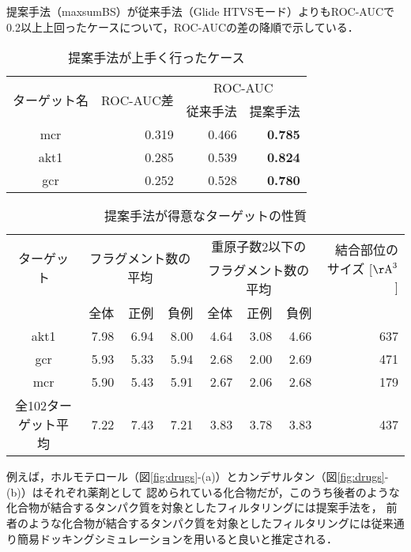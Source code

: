\begin{table}[hb] \centering
	\caption{提案手法が上手く行ったケース}
	\label{table:target_accuracy_good}
	提案手法（maxsumBS）が従来手法（Glide HTVSモード）よりもROC-AUCで\\
	0.2以上上回ったケースについて，ROC-AUCの差の降順で示している．
	\begin{tabular}{c|r|rr}
	\hline
	\multirow{2}{*}{ターゲット名}	&\multirow{2}{*}{ROC-AUC差}	&\multicolumn{2}{c}{ROC-AUC}	\\
							&							&従来手法	&提案手法		\\ \hline
	mcr					&0.319						&0.466		&{\bf 0.785}		\\
	akt1					&0.285						&0.539		&{\bf 0.824}		\\
	gcr						&0.252						&0.528		&{\bf 0.780}		\\ \hline
	\end{tabular}
\end{table}
\begin{table}[htb] \centering
	\caption{提案手法が得意なターゲットの性質}
	\label{table:good_property}
	\begin{tabular}{c|rrrrrrr}
	\hline
	\multirow{2}{*}{ターゲット}	&\multicolumn{3}{c}{\multirow{2}{*}{フラグメント数の平均}}	&\multicolumn{3}{c}{重原子数2以下の}		&\multirow{2}{*}{結合部位のサイズ [$\mathrm{\AA}^3$]}	\\
							&		&		&								&\multicolumn{3}{c}{フラグメント数の平均}	&										\\
							&全体	&正例	&負例							&全体	&正例		&負例			&										\\ \hline
	akt1						&7.98	&6.94	&8.00							&4.64	&3.08		&4.66			&637									\\
	gcr						&5.93	&5.33	&5.94							&2.68	&2.00		&2.69			&471									\\
	mcr						&5.90	&5.43	&5.91							&2.67	&2.06		&2.68			&179									\\ \hline
	全102ターゲット平均		&7.22	&7.43	&7.21							&3.83	&3.78		&3.83			&437									\\ \hline
	\end{tabular}
\end{table}

\newpage

例えば，ホルモテロール（図\ref{fig:drugs}-(a)）とカンデサルタン（図\ref{fig:drugs}-(b)）はそれぞれ薬剤として
認められている化合物だが，このうち後者のような化合物が結合するタンパク質を対象としたフィルタリングには提案手法を，
前者のような化合物が結合するタンパク質を対象としたフィルタリングには従来通り簡易ドッキングシミュレーションを用いると良いと推定される．

